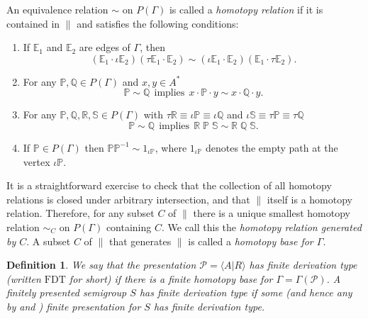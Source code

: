 \documentclass[11pt]{amsart}
\newtheorem{defn}{Definition}
\theoremstyle{plain}
\begin{document}
An equivalence relation $\sim$ on $P(\Gamma)$ is called a \emph{homotopy relation} if it is contained in $\parallel$ and satisfies the following conditions:

\begin{enumerate}[(H1)]

\item If ${\mathbb{E}}_1$ and ${\mathbb{E}}_2$ are edges of $\Gamma$, then
\[
({\mathbb{E}}_1 \cdot \iota {\mathbb{E}}_2) (\tau {\mathbb{E}}_1 \cdot {\mathbb{E}}_2) \sim
(\iota {\mathbb{E}}_1 \cdot {\mathbb{E}}_2) ({\mathbb{E}}_1 \cdot \tau {\mathbb{E}}_2 ).
\]

\item For any ${\mathbb{P}}, {\mathbb{Q}} \in P(\Gamma)$ and $x,y \in A^*$
\[
{\mathbb{P}} \sim {\mathbb{Q}} \ \ \mbox{implies} \ \  x \cdot {\mathbb{P}} \cdot y \sim x \cdot {\mathbb{Q}} \cdot y.
\]

\item For any ${\mathbb{P}}, {\mathbb{Q}}, {\mathbb{R}}, {\mathbb{S}} \in P(\Gamma)$ with $\tau {\mathbb{R}} \equiv \iota {\mathbb{P}} \equiv \iota {\mathbb{Q}}$ and $\iota {\mathbb{S}} \equiv \tau {\mathbb{P}} \equiv \tau {\mathbb{Q}}$
\[
{\mathbb{P}} \sim {\mathbb{Q}} \ \ \mbox{implies} \ \ {\mathbb{R}}\;{\mathbb{P}}\;{\mathbb{S}} \sim {\mathbb{R}}\;{\mathbb{Q}}\;{\mathbb{S}}.
\]

\item If ${\mathbb{P}} \in P(\Gamma)$ then ${\mathbb{P}} {\mathbb{P}}^{-1} \sim 1_{\iota {\mathbb{P}}}$, where $1_{\iota {\mathbb{P}}}$ denotes the empty path at the vertex $\iota {\mathbb{P}}$.

\end{enumerate}

It is a straightforward exercise to check that the collection of all homotopy relations is closed under arbitrary intersection, and that $\parallel$ itself is a homotopy relation. Therefore, for any subset $C$ of $\parallel$ there is a unique smallest homotopy relation $\sim_C$ on $P(\Gamma)$ containing $C$. We call this the \emph{homotopy relation generated by $C$}. A subset $C$ of $\parallel$ that generates $\parallel$ is called a \emph{homotopy base for $\Gamma$}.

\begin{defn}
We say that the presentation ${\mathcal{P}} = {\langle} A | R {\rangle}$ has \emph{finite derivation type} (written $\mathrm{FDT}$ for short) if there is a finite homotopy base for $\Gamma = \Gamma({\mathcal{P}})$. A finitely presented semigroup $S$ has finite derivation type if some (and hence any by \cite[Theorem~4.3]{Squier1} and \cite[Theorem~3]{Malheiro1})  finite presentation for $S$ has finite derivation type.
\end{defn}
\end{document}
